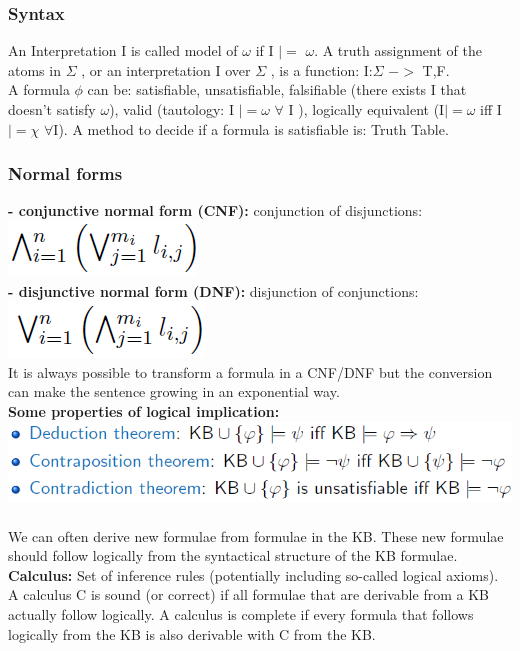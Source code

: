 \documentclass{article}
\begin{document}
\subsubsection{Syntax}
An Interpretation I is called model of $\omega$ if I $|=$ $\omega$.
A truth assignment of the atoms in $\Sigma$ , or an interpretation I over $\Sigma$ , is a function: I:$\Sigma$ $->$ {T,F}.\\
A formula $\phi$ can be: satisfiable, unsatisfiable, falsifiable (there exists I that doesn't satisfy $\omega$), valid (tautology: I $|= \omega$ $\forall$ I ), logically equivalent (I$|=\omega$ iff I$|=\chi$ $\forall$I). A method to decide if a formula is satisfiable is: Truth Table.
\subsubsection{Normal forms}
\textbf{- conjunctive normal form (CNF): }conjunction of disjunctions:\\
\includegraphics[scale=0.6]{30.png}\\
\textbf{- disjunctive normal form (DNF): }disjunction of conjunctions:\\
\includegraphics[scale=0.6]{31.png}\\
It is always possible to transform a formula in a CNF/DNF but the conversion can make the sentence growing in an exponential way.\\
\textbf{Some properties of logical implication: }\\
\includegraphics[scale=0.6]{32.png}\\\\
We can often derive new formulae from formulae in the KB. These new formulae should follow logically from the syntactical structure of the KB formulae.\\
\textbf{Calculus:} Set of inference rules (potentially including so-called logical axioms). A calculus C is sound (or correct) if all formulae that are derivable from a KB actually follow logically. A calculus is complete if every formula that follows logically from the KB is also derivable with C from the KB.\\
\end{document}
